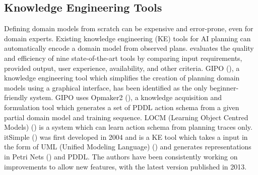 \subsection{Knowledge Engineering Tools}\label{subsec:Knowledge Engineering}
Defining domain models from scratch can be expensive and error-prone, even for domain experts.
Existing knowledge engineering (KE) tools for AI planning can automatically encode a domain model from observed plans.
\cite{jilani2014automated} evaluates the quality and efficiency of nine state-of-the-art tools by comparing input requirements, provided output, user experience, availability, and other criteria.
GIPO (\cite{simpson2007planning}), a knowledge engineering tool which simplifies the creation of planning domain models using a graphical interface, has been identified as the only beginner-friendly system.
GIPO uses Opmaker2 (\cite{mccluskey2009automated}), a knowledge acquisition and formulation tool which generates a set of PDDL action schema from a given partial domain model and training sequence.
LOCM (Learning Object Centred Models) (\cite{cresswell2013acquiring}) is a system which can learn action schema from planning traces only.
itSimple (\cite{vaquero2013itsimple}) was first developed in 2004 and is a KE tool which takes a input in the form of UML (Unified Modeling Language) (\cite{omg2005unified}) and generates representations in Petri Nets (\cite{murata1989petri}) and PDDL. The authors have been consistently working on improvements to allow new features, with the latest version published in 2013.